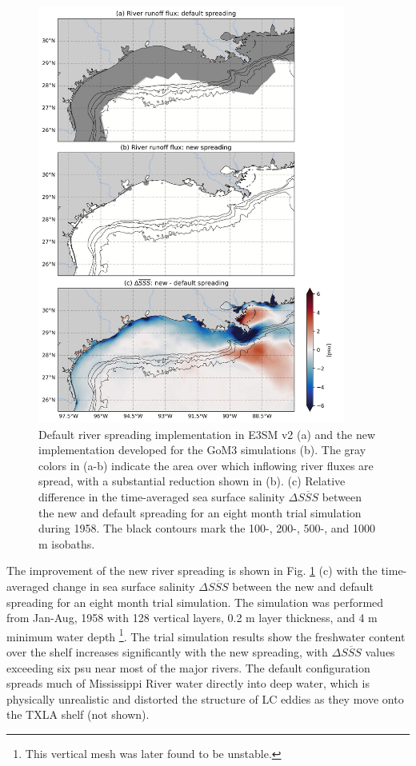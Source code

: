\begin{figure}
\centerline{\includegraphics[width=0.9\textwidth]{figures/scgsr/river_spreading.jpg}}
    \caption{Default river spreading implementation in E3SM v2 (a) and the new implementation developed for the GoM3 simulations (b). The gray colors in (a-b) indicate the area over which inflowing river fluxes are spread, with a substantial reduction shown in (b). (c) Relative difference in the time-averaged sea surface salinity $\Delta \overline{SSS}$ between the new and default spreading for an eight month trial simulation during 1958. The black contours mark the 100-, 200-, 500-, and 1000 m isobaths.}
    \label{fig:spreading}
\end{figure}

The improvement of the new river spreading is shown in Fig. \ref{fig:spreading} (c) with the time-averaged change in sea surface salinity $\Delta \overline{SSS}$ between the new and default spreading for an eight month trial simulation. The simulation was performed from Jan-Aug, 1958 with 128 vertical layers, 0.2 m layer thickness, and 4 m minimum water depth \footnote{This vertical mesh was later found to be unstable.}. The trial simulation results show the freshwater content over the shelf increases significantly with the new spreading, with $\Delta \overline{SSS}$ values exceeding six psu near most of the major rivers. The default configuration spreads much of Mississippi River water directly into deep water, which is physically unrealistic and distorted the structure of LC eddies as they move onto the TXLA shelf (not shown). 

